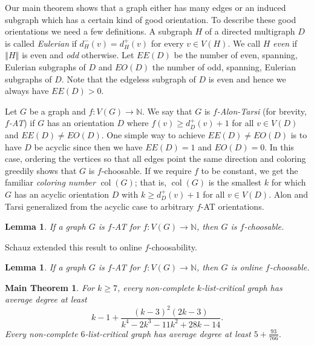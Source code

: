 \documentclass[10pt]{article}
\theoremstyle{plain}
\newtheorem*{MainTheorem}{Main Theorem}
\newtheorem{lem}[thm]{Lemma}
\theoremstyle{definition}
\theoremstyle{remark}
\newcommand{\IN}{\mathbb{N}}
\newcommand{\size}[1]{\left\Vert#1\right\Vert}
\newcommand{\func}[3]{#1\colon #2 \rightarrow #3}
\newcommand{\col}{\operatorname{col}}
\begin{document}
Our main theorem shows that a graph either has many edges or an induced subgraph which has a certain kind of good orientation.  To describe these good orientations we need a few definitions. A subgraph $H$ of a directed multigraph $D$ is called \emph{Eulerian} if $d^-_H(v) = d^+_H(v)$ for every $v \in V(H)$.  We call $H$ \emph{even} if $\size{H}$ is even and \emph{odd} otherwise.  Let $EE(D)$ be the number of even, spanning, Eulerian subgraphs of $D$ and $EO(D)$ the number of odd, spanning, Eulerian subgraphs of $D$.  Note that the edgeless subgraph of $D$ is even and hence we always have $EE(D) > 0$.

Let $G$ be a graph and $\func{f}{V(G)}{\IN}$.  We say that $G$ is \emph{$f$-Alon-Tarsi} (for brevity, \emph{$f$-AT}) if $G$ has an orientation $D$ where $f(v) \ge d_{D}^+(v) + 1$ for all $v \in V(D)$ and $EE(D) \ne EO(D)$. One simple way to achieve $EE(D) \ne EO(D)$ is to have $D$ be acyclic since then we have $EE(D) = 1$ and $EO(D) = 0$.  In this case, ordering the vertices so that all edges point the same direction and coloring greedily shows that $G$ is $f$-choosable. If we require $f$ to be constant, we get the familiar \emph{coloring number} $\col(G)$; that is, $\col(G)$ is the smallest $k$ for which $G$ has an acyclic orientation $D$ with $k \ge d_{D}^+(v) + 1$ for all $v \in V(D)$.  Alon and Tarsi \cite{Alon1992125} generalized from the acyclic case to arbitrary $f$-AT orientations.

\begin{lem}\label{AlonTarsi}
If a graph $G$ is $f$-AT for $\func{f}{V(G)}{\IN}$, then $G$ is $f$-choosable.
\end{lem}

\noindent Schauz \cite{schauz2010flexible} extended this result to online $f$-choosability.

\begin{lem}\label{Schauz}
If a graph $G$ is $f$-AT for $\func{f}{V(G)}{\IN}$, then $G$ is online $f$-choosable.
\end{lem}

\begin{MainTheorem}
For $k \ge 7$, every non-complete $k$-list-critical graph has average degree at least \[k-1 + \frac{(k-3)^2 (2 k-3)}{k^4-2 k^3-11 k^2+28 k-14}.\]
Every non-complete $6$-list-critical graph has average degree at least $5 + \frac{93}{766}$.
\end{MainTheorem}
\end{document}
